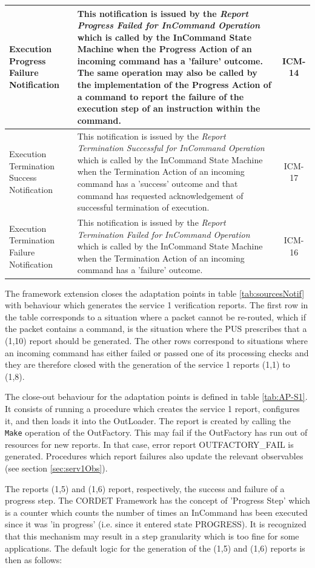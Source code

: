 \documentclass[a4paper,10pt]{article}
\begin{document}
\begin{longtable}{|>{\raggedright\arraybackslash}p{2.1cm}|>{\raggedright\arraybackslash}p{9.8cm}|c|}
\hline
Execution Progress Failure Notification &  This notification is issued by the \textit{Report Progress Failed for InCommand Operation} which is called by the InCommand State Machine when the Progress Action of an incoming command has a 'failure' outcome. The same operation may also be called by the implementation of the Progress Action of a command to report the failure of the execution step of an instruction within the command. & ICM-14 \\
\hline 
Execution Termination Success Notification &  This notification is issued by the  \textit{Report Termination Successful for InCommand Operation} which is called by the InCommand State Machine when the Termination Action of an incoming command has a 'success' outcome and that command has requested acknowledgement of successful termination of execution. & ICM-17 \\
\hline
Execution Termination Failure Notification &  This notification is issued by the
\textit{Report Termination Failed for InCommand Operation} which is called by the InCommand State Machine when the Termination Action of an incoming command has a 'failure' outcome. & ICM-16 \\
\hline
\end{longtable} 

The framework extension closes the adaptation points in table \ref{tab:sourcesNotif} with behaviour which generates the service 1 verification reports. The first row in the table corresponds to a situation where a packet cannot be re-routed, which if the packet contains a command, is the situation where the PUS prescribes that a (1,10) report should be generated. The other rows correspond to situations where an incoming command has either failed or passed one of its processing checks and they are therefore closed with the generation of the service 1 reports (1,1) to (1,8). 

The close-out behaviour for the adaptation points is defined in table \ref{tab:AP-S1}. It consists of running a procedure which creates the service 1 report, configures it, and then loads it into the OutLoader. The report is created by calling the \texttt{Make} operation of the OutFactory. This may fail if the OutFactory has run out of resources for new reports. In that case, error report OUTFACTORY\_FAIL is generated. Procedures which report failures also update the relevant observables (see section \ref{sec:serv1Obs}).

The reports (1,5) and (1,6) report, respectively, the success and failure of a progress step. The CORDET Framework has the concept of 'Progress Step' which is a counter which counts the number of times an InCommand has been executed since it was 'in progress' (i.e. since it entered state PROGRESS). It is recognized that this mechanism may result in a step granularity which is too fine for some applications. The default logic for the generation of the (1,5) and (1,6) reports is then as follows:
\end{document}

